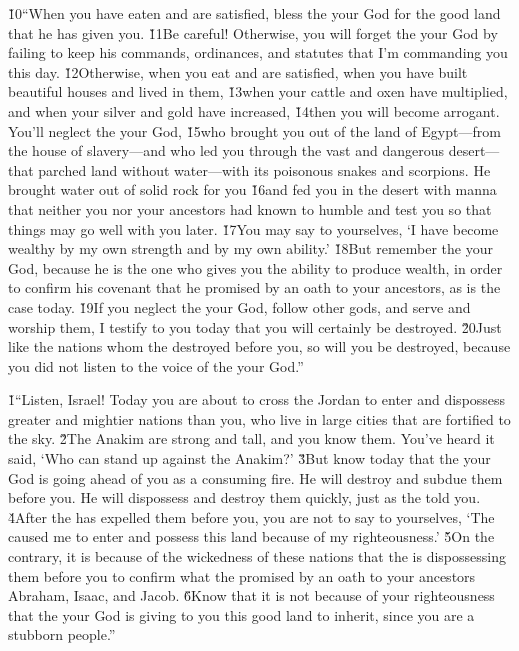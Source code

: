 \v{10}``When you have eaten and are satisfied, bless the  your God for the good land that he has given you. \v{11}Be careful! Otherwise, you will forget the  your God by failing to keep his commands, ordinances, and statutes that I'm commanding you this day. \v{12}Otherwise, when you eat and are satisfied, when you have built beautiful houses and lived in them, \v{13}when your cattle and oxen have multiplied, and when your silver and gold have increased, \v{14}then you will become arrogant. You'll neglect the  your God, \v{15}who brought you out of the land of Egypt---from the house of slavery---and who led you through the vast and dangerous desert---that parched land without water---with its poisonous snakes and scorpions. He brought water out of solid rock for you \v{16}and fed you in the desert with manna that neither you nor your ancestors had known to humble and test you so that things may go well with you later. \v{17}You may say to yourselves, `I have become wealthy by my own strength and by my own ability.' \v{18}But remember the  your God, because he is the one who gives you the ability to produce wealth, in order to confirm his covenant that he promised by an oath to your ancestors, as is the case today. \v{19}If you neglect the  your God, follow other gods, and serve and worship them, I testify to you today that you will certainly be destroyed. \v{20}Just like the nations whom the  destroyed before you, so will you be destroyed, because you did not listen to the voice of the  your God.''

\v{1}``Listen, Israel! Today you are about to cross the Jordan to enter and dispossess greater and mightier nations than you, who live in large cities that are fortified to the sky. \v{2}The Anakim are strong and tall, and you know them. You've heard it said, `Who can stand up against the Anakim?' \v{3}But know today that the  your God is going ahead of you as a consuming fire. He will destroy and subdue them before you. He will dispossess and destroy them quickly, just as the  told you. \v{4}After the  has expelled them before you, you are not to say to yourselves, `The  caused me to enter and possess this land because of my righteousness.' \v{5}On the contrary, it is because of the wickedness of these nations that the  is dispossessing them before you to confirm what the  promised by an oath to your ancestors Abraham, Isaac, and Jacob. \v{6}Know that it is not because of your righteousness that the  your God is giving to you this good land to inherit, since you are a stubborn people.''

